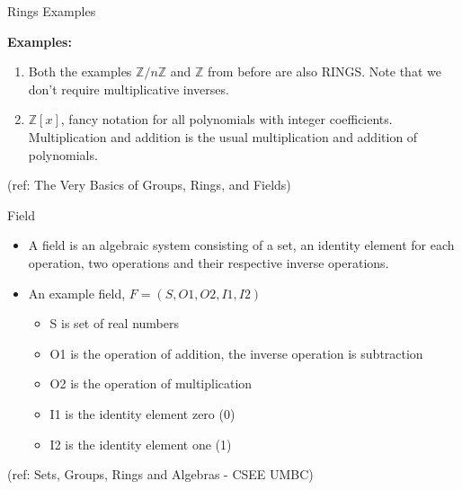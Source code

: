 \begin{frame}{Rings Examples}

{\bf Examples:} \begin{enumerate} \item Both the examples ${\mathbb Z} / n {\mathbb Z}$ and ${\mathbb Z}$ from before are also RINGS. Note that we don't require multiplicative inverses.
\item ${\mathbb Z} [ x ]$, fancy notation for all polynomials with integer coefficients. Multiplication and addition is the usual multiplication and addition of polynomials.
\end{enumerate}


\tiny{(ref: The Very Basics of Groups, Rings, and Fields)}

\end{frame}

\begin{frame}{Field}

\begin{itemize}
\item  A field is an algebraic system consisting of a set, an identity
  element for each operation, two operations and their respective inverse
  operations.
\item An example field, $F = ( S, O1, O2, I1, I2 )$
\begin{itemize}
\item S is set of real numbers
\item  O1 is the operation of addition, the inverse operation is subtraction
\item O2 is the operation of multiplication
\item I1 is the identity element zero (0)
\item I2 is the identity element one (1)
\end{itemize}
\end{itemize}


\tiny{(ref: Sets, Groups, Rings and Algebras - CSEE UMBC)}

\end{frame}




